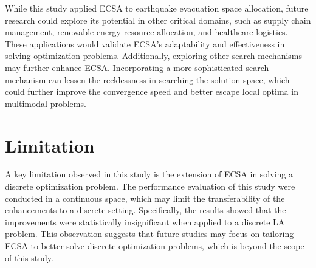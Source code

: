\documentclass{article}
\begin{document}
While this study applied ECSA to earthquake evacuation space allocation, future research could explore its potential in other critical domains, such as supply chain management, renewable energy resource allocation, and healthcare logistics. These applications would validate ECSA’s adaptability and effectiveness in solving optimization problems. Additionally, exploring other search mechanisms may further enhance ECSA. Incorporating a more sophisticated search mechanism can lessen the recklessness in searching the solution space, which could further improve the convergence speed and better escape local optima in multimodal problems.

\section{Limitation}
A key limitation observed in this study is the extension of ECSA in solving a discrete optimization problem. The performance evaluation of this study were conducted in a continuous space, which may limit the transferability of the enhancements to a discrete setting. Specifically, the results showed that the improvements were statistically insignificant when applied to a discrete LA problem. This observation suggests that future studies may focus on tailoring ECSA to better solve discrete optimization problems, which is beyond the scope of this study.




\end{document}
